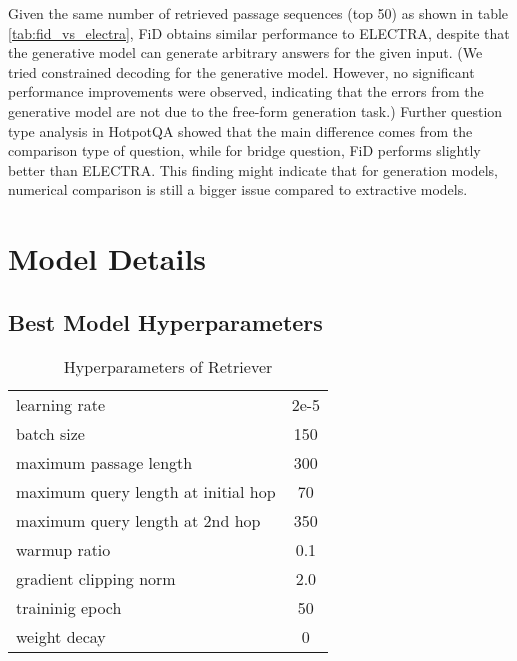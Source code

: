 \documentclass{article} \usepackage{iclr2021_conference,times}
\begin{document}
Given the same number of retrieved passage sequences (top 50) as shown in table \ref{tab:fid_vs_electra}, FiD obtains similar performance to ELECTRA, despite that the generative model can generate arbitrary answers for the given input. (We tried constrained decoding for the generative model. However, no significant performance improvements were observed, indicating that the errors from the generative model are not due to the free-form generation task.) Further question type analysis in HotpotQA showed that the main difference comes from the comparison type of question, while for bridge question, FiD performs slightly better than ELECTRA. This finding might indicate that for generation models, numerical comparison is still a bigger issue compared to extractive models.

\section{Model Details}

\subsection{Best Model Hyperparameters}
\label{appendix:hyperparameter}
\begin{table}[h]
    \centering
    \caption{Hyperparameters of Retriever}
    \begin{tabular}{lc}
    \toprule
        learning rate & 2e-5\\
        batch size & 150 \\
        maximum passage length & 300 \\
        maximum query length at initial hop & 70 \\
        maximum query length at 2nd hop & 350 \\
warmup ratio & 0.1 \\
        gradient clipping norm & 2.0 \\
        traininig epoch & 50 \\
        weight decay & 0 \\
    \bottomrule
    \end{tabular}
    \label{tab:my_label}
\end{table}
\end{document}
